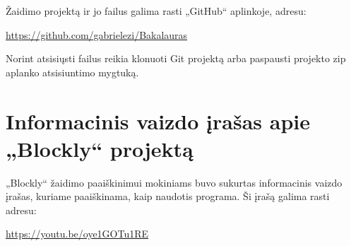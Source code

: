 \documentclass{VUMIFPSkursinis}
\begin{document}
Žaidimo projektą ir jo failus galima rasti „GitHub“ aplinkoje, adresu:

\url{https://github.com/gabrielezi/Bakalauras}

Norint atsisiųsti failus reikia klonuoti Git projektą arba paspausti projekto zip aplanko atsisiuntimo mygtuką.

\section{Informacinis vaizdo įrašas apie „Blockly“ projektą}
„Blockly“ žaidimo paaiškinimui mokiniams buvo sukurtas informacinis vaizdo įrašas, kuriame paaiškinama, kaip naudotis programa. Ši įrašą galima rasti adresu:

\url{https://youtu.be/oye1GOTu1RE}
\end{document}
